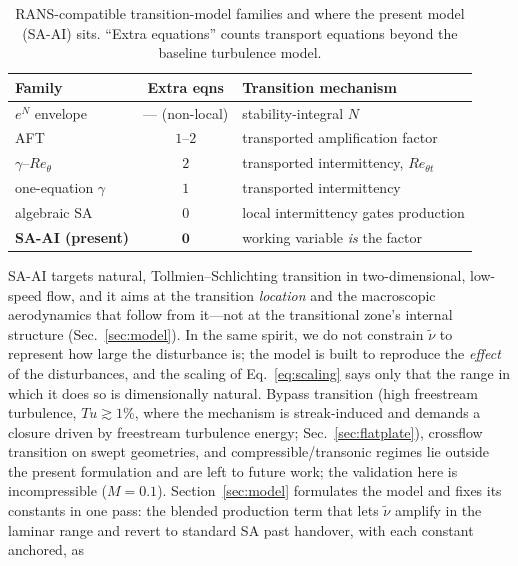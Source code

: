 \documentclass[journal]{new-aiaa}
\begin{document}
\begin{table}[t]
  \centering
  \caption{RANS-compatible transition-model families and where the present model
  (SA-AI) sits. ``Extra equations'' counts transport equations beyond the baseline
  turbulence model.}
  \label{tab:taxonomy}
  \begin{tabular}{lcl}
    \toprule
    Family & Extra eqns & Transition mechanism \\
    \midrule
    $e^N$ envelope \cite{smith_gamberoni_1956, drela_giles_1987} & --- (non-local) & stability-integral $N$ \\
    AFT \cite{coder_maughmer_2014, halila_2022} & $1$--$2$ & transported amplification factor \\
    $\gamma$--$Re_\theta$ \cite{langtry_menter_2009, medida_baeder_2011} & $2$ & transported intermittency, $Re_{\theta t}$ \\
    one-equation $\gamma$ \cite{menter_gamma_2015} & $1$ & transported intermittency \\
    algebraic SA \cite{cakmakcioglu_2018, rahman_2024} & $0$ & local intermittency gates production \\
    \textbf{SA-AI (present)} & $\mathbf{0}$ & working variable \emph{is} the factor \\
    \bottomrule
  \end{tabular}
\end{table}
SA-AI targets natural, Tollmien--Schlichting
transition in two-dimensional, low-speed flow, and it aims at the
transition \emph{location} and the macroscopic aerodynamics that follow
from it---not at the transitional zone's internal structure
(Sec.~\ref{sec:model}). In the same spirit, we do not constrain
$\tilde\nu$ to represent how large the disturbance is; the model is built to
reproduce the \emph{effect} of the
disturbances, and the scaling of Eq.~\eqref{eq:scaling} says only that
the range in which it does so is dimensionally natural. Bypass transition (high freestream
turbulence, $Tu\!\gtrsim\!1\%$, where the mechanism is streak-induced and demands a
closure driven by freestream turbulence energy; Sec.~\ref{sec:flatplate}),
crossflow transition on swept geometries, and compressible/transonic regimes lie
outside the present formulation and are left to future work; the validation here is
incompressible ($M\!=\!0.1$).
Section~\ref{sec:model} formulates the model and fixes its constants in one
pass: the blended production term that lets $\tilde\nu$ amplify in the laminar
range and revert to standard SA past handover, with each constant anchored, as
\end{document}
